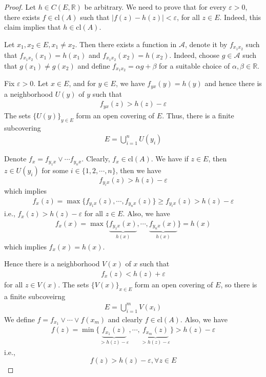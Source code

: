 \documentclass[12pt,leqno]{amsart}
\theoremstyle{definition}
\numberwithin{equation}{subsection}
\begin{document}
\begin{proof}
Let $h\in C(E,\mathbb{R})$ be arbitrary. We need to prove that for every $\varepsilon > 0$, there exists $f\in\text{cl}(A)$ such that $|f(z) - h(z)| < \varepsilon$, for all $z\in E$. Indeed, this claim implies that $h\in \text{cl}(A)$.

Let $x_1, x_2\in E, x_1\neq x_2$. Then there exists a function in $\mathcal{A}$, denote it by $f_{x_1 x_2}$ such that $f_{x_1 x_2}(x_1) = h(x_1)$ and $f_{x_1 x_2}(x_2) = h(x_2)$. Indeed, choose $g\in\mathcal{A}$ such that $g(x_1)\neq g(x_2)$ and define $f_{x_1 x_2} = \alpha g+\beta$ for a suitable choice of $\alpha, \beta\in\mathbb{R}$.

Fix $\varepsilon > 0$. Let $x\in E$, and for $y\in E$, we have $f_{yx}(y) = h(y)$ and hence there is a neighborhood $U(y)$ of $y$ such that 
\begin{align*}
    f_{yx}(z) > h(z) - \varepsilon
\end{align*}
The sets $\{U(y)\}_{y\in E}$ form an open covering of $E$. Thus, there is a finite subcovering
\begin{align*}
    E = \bigcup^n_{i=1}U(y_i)
\end{align*}

Denote $f_x = f_{y_1 x}\vee \cdots f_{y_n x}$. Clearly, $f_x\in \text{cl}(A)$. We have if $z\in E$, then $z\in U(y_i)$ for some $i\in\{1,2,\cdots,n\}$, then we have $$f_{y_i x}(z) > h(z) - \varepsilon$$
which implies 
\begin{align*}
    f_x(z) = \max\{f_{y_1 x}(z), \cdots, f_{y_n x}(z)\} \geq f_{y_i x}(z) > h(z) - \varepsilon
\end{align*}
i.e., $f_x(z) > h(z) - \varepsilon$ for all $z\in E$. Also, we have 
\begin{align*}
    f_x(x) = \max\{\underbrace{f_{y_1 x}(x)}_{h(x)}, \cdots, \underbrace{f_{y_n x}(x)}_{h(x)}\} = h(x)
\end{align*}
which implies $f_x(x) = h(x)$. 

Hence there is a neighborhood $V(x)$ of $x$ such that 
\begin{align*}
    f_x(z) < h(z) + \varepsilon
\end{align*}
for all $z\in V(x)$. The sets $\{V(x)\}_{x\in E}$ form an open covering of $E$, so there is a finite subcoveirng 
\begin{align*}
    E = \bigcup^m_{i=1}V(x_i)
\end{align*}
We define $f = f_{x_1}\vee\cdots\vee f(x_m)$ and clearly $f\in \text{cl}(A)$. Also, we have 
\begin{align*}
    f(z) = \min\{\underbrace{f_{x_1}(z)}_{>h(z)-\varepsilon}, \cdots, \underbrace{f_{x_m}(z)}_{>h(z)-\varepsilon}\} > h(z) - \varepsilon
\end{align*}
i.e.,  
\begin{equation}\label{equ_2}
    f(z) > h(z) -\varepsilon, \forall z\in E
\end{equation}


\end{proof}
\end{document}

